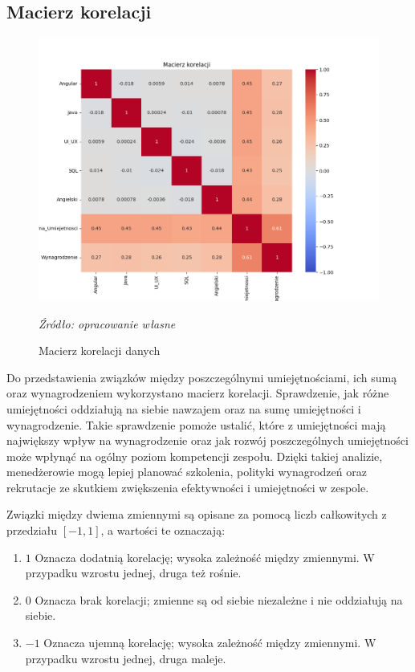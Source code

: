     \subsection{Macierz korelacji}\label{subsec:korelacja}
    \begin{figure}[H]
        \centering
        \includegraphics[width=\linewidth]{chapters/Images/korelacja.png}
        \cprotect\caption{Macierz korelacji danych}
        \textit{Źródło: opracowanie własne} 
        \label{fig:korelacja}
    \end{figure}

    \par Do przedstawienia związków między poszczególnymi umiejętnościami, ich sumą oraz wynagrodzeniem wykorzystano macierz korelacji. Sprawdzenie, jak różne umiejętności oddziałują na siebie nawzajem oraz na sumę umiejętności i wynagrodzenie. Takie sprawdzenie pomoże ustalić, które z umiejętności mają największy wpływ na wynagrodzenie oraz jak rozwój poszczególnych umiejętności może wpłynąć na ogólny poziom kompetencji zespołu. Dzięki takiej analizie, menedżerowie mogą lepiej planować szkolenia, polityki wynagrodzeń oraz rekrutacje ze skutkiem zwiększenia efektywności i umiejętności w zespole.

    \par Związki między dwiema zmiennymi są opisane za pomocą liczb całkowitych z przedziału $[-1, 1]$, a wartości te oznaczają:
    \begin{enumerate}
        \item $1$ Oznacza dodatnią korelację; wysoka zależność między zmiennymi. W przypadku wzrostu jednej, druga też rośnie.
        \item $0$ Oznacza brak korelacji; zmienne są od siebie niezależne i nie oddziałują na siebie.
        \item $-1$ Oznacza ujemną korelację; wysoka zależność między zmiennymi. W przypadku wzrostu jednej, druga maleje.
    \end{enumerate}

